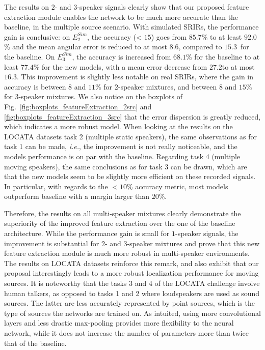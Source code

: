 The results on $2$- and $3$-speaker signals clearly show that our proposed feature extraction module enables the network to be much more accurate than the baseline, in the multiple source scenario. With simulated SRIRs, the performance gain is conclusive: on $E^{Sim}_2$, the accuracy (< $15$\textdegree) goes from $85.7$\% to at least $92.0$\% and the mean angular error is reduced to at most $8.6$\textdegree, compared to $15.3$\textdegree~for the baseline. On $E^{Sim}_3$, the accuracy is increased from $68.1$\% for the baseline to at least $77.4$\% for the new models, with a mean error decrease from $27.2$\textdegree to at most $16.3$\textdegree. This improvement is slightly less notable on real SRIRs, where the gain in accuracy is between $8$ and $11$\% for $2$-speaker mixtures, and between $8$ and $15$\% for $3$-speaker mixtures. We also notice on the boxplots of Fig.~\ref{fig:boxplots_featureExtraction_2src} and \ref{fig:boxplots_featureExtraction_3src} that the error dispersion is greatly reduced, which indicates a more robust model. When looking at the results on the LOCATA datasets task 2 (multiple static speakers), the same observations as for task 1 can be made, \emph{i.e.}, the improvement is not really noticeable, and the models performance is on par with the baseline. Regarding task 4 (multiple moving speakers), the same conclusions as for task 3 can be drawn, which are that the new models seem to be slightly more efficient on these recorded signals. In particular, with regards to the $<10\%$ accuracy metric, most models outperform baseline with a margin larger than $20\%$.

Therefore, the results on all multi-speaker mixtures clearly demonstrate the superiority of the improved feature extraction over the one of the baseline architecture. While the performance gain is small for $1$-speaker signals, the improvement is substantial for $2$- and $3$-speaker mixtures and prove that this new feature extraction module is much more robust in multi-speaker environments. The results on LOCATA datasets reinforce this remark, and also exhibit that our proposal interestingly leads to a more robust localization performance for moving sources. It is noteworthy that the tasks 3 and 4 of the LOCATA challenge involve human talkers, as opposed to tasks 1 and 2 where loudspeakers are used as sound sources. The latter are less accurately represented by point sources, which is the type of sources the networks are trained on. As intuited, using more convolutional layers and less drastic max-pooling provides more flexibility to the neural network, while it does not increase the number of parameters more than twice that of the baseline.

